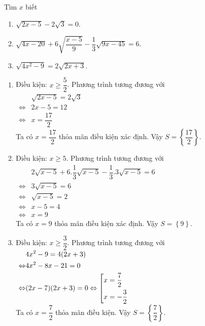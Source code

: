 \begin{ex} %
    Tìm $x$ biết
    \begin{enumerate}
        \item $\sqrt{2x-5}-2\sqrt{3}=0$.
        \item $\sqrt{4x-20}+6\sqrt{\dfrac{x-5}{9}}-\dfrac{1}{3}\sqrt{9x-45}=6$.
        \item $\sqrt{4x^2-9}=2\sqrt{2x+3}$.
    \end{enumerate}
\loigiai
    {
    \begin{enumerate}
        \item Điều kiện: $x\ge \dfrac{5}{2}$. Phương trình tương đương với\\
        $\begin{aligned}
        &\sqrt{2x-5}=2\sqrt{3}\\
        \Leftrightarrow & 2x-5=12\\
        \Leftrightarrow & x=\dfrac{17}{2}
        \end{aligned}$\\
        Ta có $x=\dfrac{17}{2}$ thỏa mãn điều kiện xác định. Vậy $S=\left\lbrace \dfrac{17}{2}\right\rbrace $.
        \item Điều kiện: $x\ge 5$. Phương trình tương đương với\\
        $\begin{aligned}
        & 2\sqrt{x-5}+6.\dfrac{1}{3}\sqrt{x-5}-\dfrac{1}{3}.3\sqrt{x-5}=6\\
        \Leftrightarrow & 3\sqrt{x-5}=6\\
        \Leftrightarrow & \sqrt{x-5}=2\\
        \Leftrightarrow & x-5=4\\
        \Leftrightarrow & x=9
        \end{aligned}
        $
       \\ Ta có $x=9$ thỏa mãn điều kiện xác định. Vậy $S=\left\lbrace 9\right\rbrace $.
        \item Điều kiện: $x\ge \dfrac{3}{2}$. Phương trình tương đương với\\
        $\begin{aligned}
       & 4x^2-9=4(2x+3)\\\
       \Leftrightarrow & 4x^2-8x-21=0\\
       \Leftrightarrow & (2x-7)(2x+3)=0
       \Leftrightarrow \left[\begin{aligned}& x=\dfrac{7}{2}\\ & x=-\dfrac{3}{2}\end{aligned}\right.
        \end{aligned}$\\
        Ta có $x=\dfrac{7}{2}$ thỏa mãn điều kiện. Vậy $S=\left\lbrace \dfrac{7}{2}\right\rbrace $.
    \end{enumerate}
    }
\end{ex}

